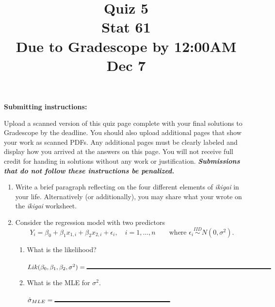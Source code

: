 \documentclass[12pt]{article}
\title{Quiz 5\\
Stat 61\\ 
Due to Gradescope by 12:00AM Dec 7
}
\date{}
\begin{document}
\maketitle
\vspace{-2.2cm}
\noindent \textbf{Submitting instructions:} 

\noindent Upload a scanned version of this quiz page complete with your final solutions to Gradescope by the deadline. You should also upload additional pages that show your work as scanned PDFs. Any additional pages must be clearly labeled and display how you arrived at the answers on this page. You will not receive full credit for handing in solutions without any work or justification. \textbf{\textit{Submissions that do not follow these instructions be penalized.}} 

\vspace{0.5cm}

\begin{enumerate}[leftmargin=\labelsep]
\item Write a brief paragraph reflecting on the four different elements of {\it ikigai} in your life. Alternatively (or additionally), you may share what your wrote on the {\it ikigai} worksheet.

\vspace{5cm}

\item Consider the regression model with two predictors
$$Y_i = \beta_0 + \beta_1 x_{1,i} + \beta_2 x_{2,i} + \epsilon_i, \quad i=1,\dots,n \quad \quad
\text{where }\epsilon_i \stackrel{IID}{\sim} N(0, \sigma^2).$$ 

\begin{enumerate}
\item What is the likelihood? \\
\vspace{.6cm}\\
$Lik(\beta_0, \beta_1, \beta_2, \sigma^2) = \rule{10cm}{0.5mm}$

\item What is the MLE for $\sigma^2$. \\
\vspace{.6cm}\\
$\hat{\sigma}_{MLE} = \rule{6cm}{0.5mm}$
\end{enumerate}

\end{enumerate}
\end{document}
